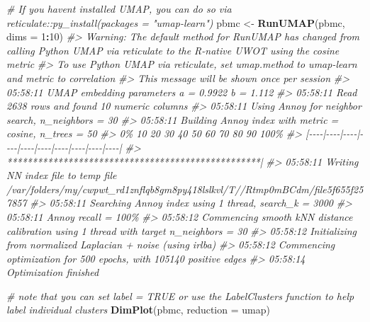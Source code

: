 \documentclass[
]{book}
\newenvironment{Shaded}{\begin{snugshade}}{\end{snugshade}}
\newcommand{\AttributeTok}[1]{\textcolor[rgb]{0.13,0.29,0.53}{#1}}
\newcommand{\CommentTok}[1]{\textcolor[rgb]{0.56,0.35,0.01}{\textit{#1}}}
\newcommand{\DecValTok}[1]{\textcolor[rgb]{0.00,0.00,0.81}{#1}}
\newcommand{\FunctionTok}[1]{\textcolor[rgb]{0.13,0.29,0.53}{\textbf{#1}}}
\newcommand{\NormalTok}[1]{#1}
\newcommand{\OtherTok}[1]{\textcolor[rgb]{0.56,0.35,0.01}{#1}}
\newcommand{\SpecialCharTok}[1]{\textcolor[rgb]{0.81,0.36,0.00}{\textbf{#1}}}
\newcommand{\StringTok}[1]{\textcolor[rgb]{0.31,0.60,0.02}{#1}}
\begin{document}
\begin{Shaded}
\begin{Highlighting}[]
\CommentTok{\# If you haven\textquotesingle{}t installed UMAP, you can do so via reticulate::py\_install(packages = "umap{-}learn")}
\NormalTok{pbmc }\OtherTok{\textless{}{-}} \FunctionTok{RunUMAP}\NormalTok{(pbmc, }\AttributeTok{dims =} \DecValTok{1}\SpecialCharTok{:}\DecValTok{10}\NormalTok{)}
\CommentTok{\#\textgreater{} Warning: The default method for RunUMAP has changed from calling Python UMAP via reticulate to the R{-}native UWOT using the cosine metric}
\CommentTok{\#\textgreater{} To use Python UMAP via reticulate, set umap.method to \textquotesingle{}umap{-}learn\textquotesingle{} and metric to \textquotesingle{}correlation\textquotesingle{}}
\CommentTok{\#\textgreater{} This message will be shown once per session}
\CommentTok{\#\textgreater{} 05:58:11 UMAP embedding parameters a = 0.9922 b = 1.112}
\CommentTok{\#\textgreater{} 05:58:11 Read 2638 rows and found 10 numeric columns}
\CommentTok{\#\textgreater{} 05:58:11 Using Annoy for neighbor search, n\_neighbors = 30}
\CommentTok{\#\textgreater{} 05:58:11 Building Annoy index with metric = cosine, n\_trees = 50}
\CommentTok{\#\textgreater{} 0\%   10   20   30   40   50   60   70   80   90   100\%}
\CommentTok{\#\textgreater{} [{-}{-}{-}{-}|{-}{-}{-}{-}|{-}{-}{-}{-}|{-}{-}{-}{-}|{-}{-}{-}{-}|{-}{-}{-}{-}|{-}{-}{-}{-}|{-}{-}{-}{-}|{-}{-}{-}{-}|{-}{-}{-}{-}|}
\CommentTok{\#\textgreater{} **************************************************|}
\CommentTok{\#\textgreater{} 05:58:11 Writing NN index file to temp file /var/folders/my/cwpwt\_rd1znflqb8gm8py418lslkvl/T//Rtmp0mBCdm/file5f655f257857}
\CommentTok{\#\textgreater{} 05:58:11 Searching Annoy index using 1 thread, search\_k = 3000}
\CommentTok{\#\textgreater{} 05:58:11 Annoy recall = 100\%}
\CommentTok{\#\textgreater{} 05:58:12 Commencing smooth kNN distance calibration using 1 thread with target n\_neighbors = 30}
\CommentTok{\#\textgreater{} 05:58:12 Initializing from normalized Laplacian + noise (using irlba)}
\CommentTok{\#\textgreater{} 05:58:12 Commencing optimization for 500 epochs, with 105140 positive edges}
\CommentTok{\#\textgreater{} 05:58:14 Optimization finished}
\end{Highlighting}
\end{Shaded}

\begin{Shaded}
\begin{Highlighting}[]
\CommentTok{\# note that you can set \textasciigrave{}label = TRUE\textasciigrave{} or use the LabelClusters function to help label individual clusters}
\FunctionTok{DimPlot}\NormalTok{(pbmc, }\AttributeTok{reduction =} \StringTok{\textquotesingle{}umap\textquotesingle{}}\NormalTok{)}
\end{Highlighting}
\end{Shaded}
\end{document}
